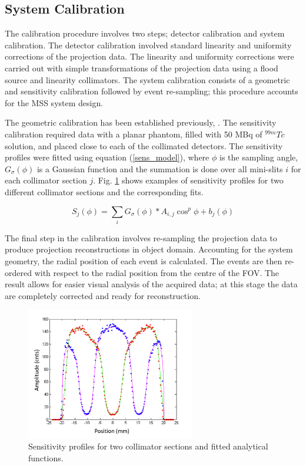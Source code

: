 \subsection{System Calibration}
 The calibration procedure involves two steps; detector calibration and system calibration. The detector calibration involved standard linearity and uniformity corrections of the projection data. The linearity and uniformity corrections were carried out with simple transformations of the projection data using a flood source and linearity collimators. The system calibration consists of a geometric and sensitivity calibration followed by event re-sampling; this procedure accounts for the MSS system design. 
 
The geometric calibration has been established previously, \cite{8340862}. The sensitivity calibration required data with a planar phantom, filled with 50 MBq of $^{99m}Tc$ solution, and placed close to each of the collimated detectors. The sensitivity profiles were fitted using equation (\ref{sens_model}), where $\phi$ is the sampling angle, $G_{σ}(\phi)$ is a Gaussian function and the summation is done over all mini-slits $i$ for each collimator section $j$. Fig. \ref{fig_sensprof} shows examples of sensitivity profiles for two different collimator sections and the corresponding fits.

\begin{equation}
\label{sens_model}
S_{j}(\phi) = \sum_{i} G_{\sigma}(\phi) \ast A_{i,j} \cos^{p}{\phi} + b_{j}(\phi)
\end{equation}

The final step in the calibration involves re-sampling the projection data to produce projection reconstructions in object domain. Accounting for the system geometry, the radial position of each event is calculated. The events are then re-ordered with respect to the radial position from the centre of the FOV. The result allows for easier visual analysis of the acquired data; at this stage the data are completely corrected and ready for reconstruction. 

\begin{figure}[!t]
\centering
\includegraphics[width=2.9in]{figures/sns_prof.png}

\caption{Sensitivity profiles for two collimator sections and fitted analytical functions.}
\label{fig_sensprof}
\end{figure}
 
